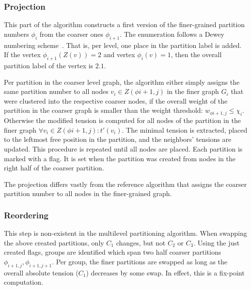         \subsubsection*{Projection}
        This part of the algorithm constructs a first version of the finer-grained partition numbers $\phi_i$ from the coarser ones $\phi_{i + 1}$.
        The enumeration follows a Dewey numbering scheme~\autocite{dewey1894decimal}.
        That is, per level, one place in the partition label is added. 
        If the vertex $\phi_{i+1}(Z(v)) = 2$ and vertex $\phi_i(v) = 1$, then the overall partition label of the vertex is $2\text{.}1$. 
        
        Per partition in the coarser level graph, the algorithm either simply assigns the same partition number to all nodes $v_i \in Z(\phi{i+1,j})$ in the finer graph $G_i$ that were clustered into the respective coarser nodes, if the overall weight of the partition in the coarser graph is smaller than the weight threshold: $w_{\phi{i+1, j}} \leq \chi_i$.
        Otherwise the modified tension is computed for all nodes of the partition in the finer graph $\forall v_i \in Z(\phi{i+1,j}): t'(v_i)$.
        The minimal tension is extracted, placed to the leftmost free position in the partition, and the neighbors' tensions are updated. 
        This procedure is repeated until all nodes are placed.
        Each partition is marked with a flag.
	It is set when the partition was created from nodes in the right half of the coarser partition.
        
        The projection differs vastly from the reference algorithm that assigns the coarser partition number to all nodes in the finer-grained graph.
                
        \subsubsection*{Reordering}
        This step is non-existent in the multilevel partitioning algorithm.
        When swapping the above created partitions, only $C_1$ changes, but not $C_2$ or $C_3$. Using the just created flags, groups are identified which span two half coarser partitions $\phi_{i+1,j}, \phi_{i+1,j+1}$. Per group, the finer partitions are swapped as long as the overall absolute tension ($C_1$) decreases by some swap.
        In effect, this is a fix-point computation.
        

